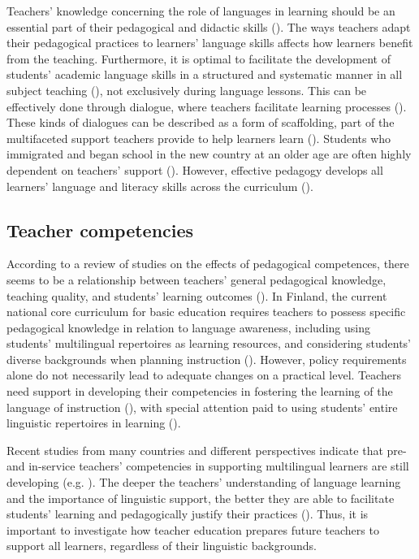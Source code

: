\documentclass[output=paper]{langscibook}
\begin{document}
Teachers’ knowledge concerning the role of languages in learning should be an essential part of their pedagogical and didactic skills (\citealt{CarlsonEtAl2018,ShanahanShanahan2008}). The ways teachers adapt their pedagogical practices to learners’ language skills affects how learners benefit from the teaching. Furthermore, it is optimal to facilitate the development of students’ academic language skills in a structured and systematic manner in all subject teaching (\citealt{CarlsonEtAl2018,ShanahanShanahan2008}), not exclusively during language lessons.  This can be effectively done through dialogue, where teachers facilitate learning processes (\citealt{TharpEtAl2018}). These kinds of dialogues can be described as a form of scaffolding, part of the multifaceted support teachers provide to help learners learn (\citealt{Gibbons2014}). Students who immigrated and began school in the new country at an older age are often highly dependent on teachers’ support (\citealt{Sharif2017}). However, effective pedagogy develops  {all} learners’ language and literacy skills across the curriculum (\citealt{CumminsEarly2015,TharpEtAl2018}).

\subsection{Teacher competencies}\label{sec:alisaari:2.2}

According to a review of studies on the effects of pedagogical competences, there seems to be a relationship between teachers’ general pedagogical knowledge, teaching quality, and students’ learning outcomes (\citealt{UlfertsEtAl2019}). In Finland, the current national core curriculum for basic education requires teachers to possess specific pedagogical knowledge in relation to language awareness, including using students’ multilingual repertoires as learning resources, and considering students’ diverse backgrounds when planning instruction (\citealt{Finnish_national_agency_of_education2014}). However, policy requirements alone do not necessarily lead to adequate changes on a practical level. Teachers need support in developing their competencies in fostering the learning of the language of instruction (\citealt{KiefferLesaux2012}), with special attention paid to using students’ entire linguistic repertoires in learning (\citealt{Cummins2021}).

Recent studies from many countries and different perspectives indicate that pre- and in-service teachers’ competencies in supporting multilingual learners are still developing (e.g. \citealt{AgirdagEtAl2014,AlisaariEtAl2019,Alisaari2020_Apples,FanecaEtAl2016,HeikkolaEtAl2021,Iversen2020,Lundberg2019,Rodriguez-izquierdo2020}). The deeper the teachers’ understanding of language learning and the importance of linguistic support, the better they are able to facilitate students’ learning and pedagogically justify their practices (\citealt{Alisaari2020_Apples,HeikkolaEtAl2022}). Thus, it is important to investigate how teacher education prepares future teachers to support all learners, regardless of their linguistic backgrounds.
\end{document}
